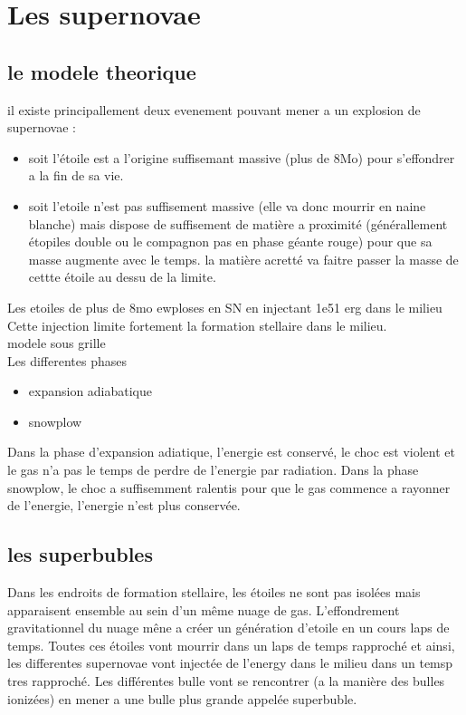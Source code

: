 \section{Les supernovae}

\subsection{le modele theorique}
il existe principallement deux evenement pouvant mener a un explosion de supernovae : 

\begin{itemize}
\item soit l'étoile est a l'origine suffisemant massive (plus de 8Mo) pour s'effondrer a la fin de sa vie.
\item soit l'etoile n'est pas suffisement massive (elle va donc mourrir en naine blanche) mais dispose de suffisement de matière a proximité (générallement étopiles double ou le compagnon pas en phase géante rouge) pour que sa masse augmente avec le temps.
la matière acretté va faitre passer la masse de cettte étoile au dessu de la limite.
\end{itemize}


Les etoiles de plus de 8mo ewploses en SN en injectant 1e51 erg dans le milieu\\
Cette injection limite fortement la formation stellaire dans le milieu.\\
modele sous grille\\



Les differentes phases
\begin{itemize}
\item expansion adiabatique
\item snowplow
\end{itemize}

Dans la phase d'expansion adiatique, l'energie est conservé, le choc est violent et le gas n'a pas le temps de perdre de l'energie par radiation.
Dans la phase snowplow, le choc a suffisemment ralentis pour que le gas commence a rayonner de l'energie, l'energie n'est plus conservée.


\subsection{les superbubles}
Dans les endroits de formation stellaire, les étoiles ne sont pas isolées mais apparaisent ensemble au sein d'un même nuage de gas.
L'effondrement gravitationnel du nuage mêne a créer un génération d'etoile en un cours laps de temps.
Toutes ces étoiles vont mourrir dans un laps de temps rapproché et ainsi, les differentes supernovae vont injectée de l'energy dans le milieu dans un temsp tres rapproché.
Les différentes bulle vont se rencontrer (a la manière des bulles ionizées) en mener a une bulle plus grande appelée superbuble.


